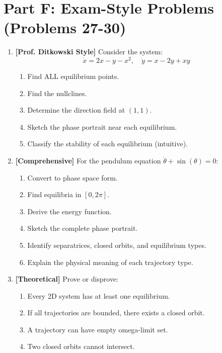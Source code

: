 \documentclass[12pt]{article}
\begin{document}
\section*{Part F: Exam-Style Problems (Problems 27-30)}

\begin{enumerate}[resume]
\item \textbf{[Prof. Ditkowski Style]} Consider the system:
$$\dot{x} = 2x - y - x^2, \quad \dot{y} = x - 2y + xy$$
\begin{enumerate}[label=(\alph*)]
    \item Find ALL equilibrium points.
    \item Find the nullclines.
    \item Determine the direction field at $(1, 1)$.
    \item Sketch the phase portrait near each equilibrium.
    \item Classify the stability of each equilibrium (intuitive).
\end{enumerate}

\item \textbf{[Comprehensive]} For the pendulum equation $\ddot{\theta} + \sin(\theta) = 0$:
\begin{enumerate}[label=(\alph*)]
    \item Convert to phase space form.
    \item Find equilibria in $[0, 2\pi]$.
    \item Derive the energy function.
    \item Sketch the complete phase portrait.
    \item Identify separatrices, closed orbits, and equilibrium types.
    \item Explain the physical meaning of each trajectory type.
\end{enumerate}

\item \textbf{[Theoretical]} Prove or disprove:
\begin{enumerate}[label=(\alph*)]
    \item Every 2D system has at least one equilibrium.
    \item If all trajectories are bounded, there exists a closed orbit.
    \item A trajectory can have empty omega-limit set.
    \item Two closed orbits cannot intersect.
\end{enumerate}


\end{enumerate}
\end{document}
